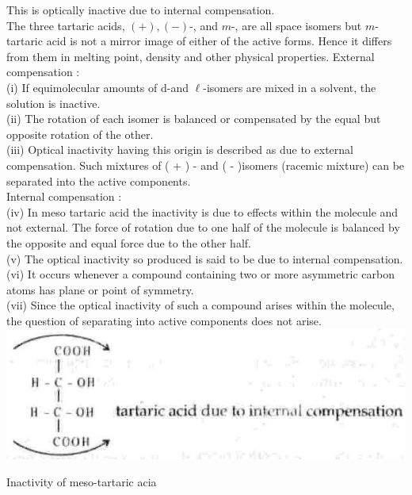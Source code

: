 \documentclass[10pt]{article}
\begin{document}
This is optically inactive due to internal compensation.\\
The three tartaric acids, $(+),(-)$-, and $m$-, are all space isomers but $m$-tartaric acid is not a mirror image of either of the active forms. Hence it differs from them in melting point, density and other physical properties. External compensation :\\
(i) If equimolecular amounts of d-and $\ell$-isomers are mixed in a solvent, the solution is inactive.\\
(ii) The rotation of each isomer is balanced or compensated by the equal but opposite rotation of the other.\\
(iii) Optical inactivity having this origin is described as due to external compensation. Such mixtures of ( + ) - and ( - )isomers (racemic mixture) can be separated into the active components.\\
Internal compensation :\\
(iv) In meso tartaric acid the inactivity is due to effects within the molecule and not external. The force of rotation due to one half of the molecule is balanced by the opposite and equal force due to the other half.\\
(v) The optical inactivity so produced is said to be due to internal compensation.\\
(vi) It occurs whenever a compound containing two or more asymmetric carbon atoms has plane or point of symmetry.\\
(vii) Since the optical inactivity of such a compound arises within the molecule, the question of separating into active components does not arise.\\
\includegraphics[max width=\textwidth, center]{2025_01_28_8470952b98110cec3aabg-058(4)}

Inactivity of meso-tartaric acia
\end{document}
